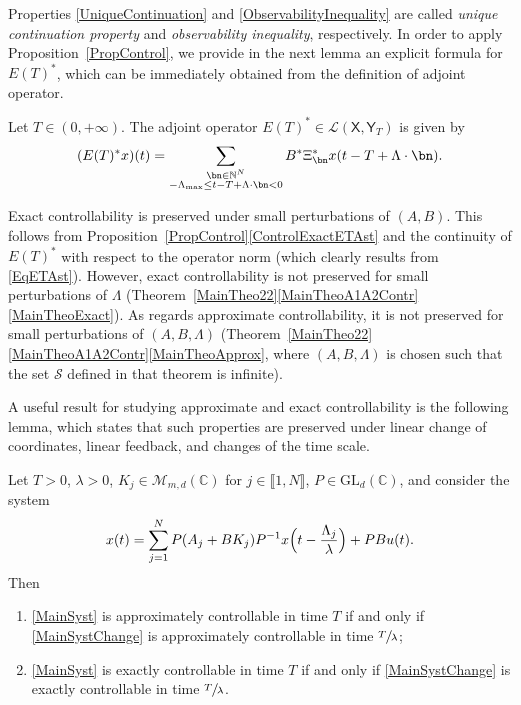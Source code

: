 Properties \eqref{UniqueContinuation} and \eqref{ObservabilityInequality} are called \emph{unique continuation property} and \emph{observability inequality}, respectively. In order to apply Proposition~\ref{PropControl}, we provide in the next lemma an explicit formula for $E(T)^\ast$, which can be immediately obtained from the definition of adjoint operator.

\begin{lemm}
\label{LemmETAdj}
Let $T \in (0, +\infty)$. The adjoint operator $E(T)^\ast \in \mathcal L(\mathsf X, \mathsf Y_T)$ is given by
\begin{equation}
\label{EqETAst}
(E(T)^\ast x)(t) = \sum_{\substack{\bn \in \mathbb N^N \\ -\Lambda_{\max} \leq t - T + \Lambda \cdot \bn < 0}} B^\ast \Xi_{\bn}^\ast x(t - T + \Lambda \cdot \bn).
\end{equation}
\end{lemm}

\begin{remk}
Exact controllability is preserved under small perturbations of $(A, B)$. This follows from Proposition~\ref{PropControl}\eqref{ControlExactETAst} and the continuity of $E(T)^\ast$ with respect to the operator norm (which clearly results from \eqref{EqETAst}). However, exact controllability is not preserved for small perturbations of $\Lambda$ (\cf Theorem~\ref{MainTheo22}\eqref{MainTheoA1A2Contr}\eqref{MainTheoExact}). As regards approximate controllability, it is not preserved for small perturbations of $(A, B, \Lambda)$ (\cf Theorem~\ref{MainTheo22}\eqref{MainTheoA1A2Contr}\eqref{MainTheoApprox}, where $(A, B, \Lambda)$ is chosen such that the set $\mathcal S$ defined in that theorem is infinite).
\end{remk}

A useful result for studying approximate and exact controllability is the following lem\-ma, which states that such properties are preserved under linear change of coordinates, linear feedback, and changes of the time scale.

\begin{lemm}
\label{LemmControlDelayInvariant}
Let $T > 0$, $\lambda > 0$, $K_j \in \mathcal M_{m, d}(\mathbb C)$ for $j \in \llbracket 1, N\rrbracket$, $P \in \mathrm{GL}_d(\mathbb C)$, and consider the system
\begin{equation}
\label{MainSystChange}
x(t) = \sum_{j=1}^N P(A_j + B K_j) P^{-1} x\Bigl(t - \frac{\Lambda_j}{\lambda}\Bigr) + P B u(t).
\end{equation}
Then
\begin{enumerate}
\item\label{ApproxContrlIff} \eqref{MainSyst} is approximately controllable in time $T$ if and only if \eqref{MainSystChange} is approximately controllable in time $\sfrac{T}{\lambda}$;

\item\label{ExactContrlIff} \eqref{MainSyst} is exactly controllable in time $T$ if and only if \eqref{MainSystChange} is exactly controllable in time $\sfrac{T}{\lambda}$.
\end{enumerate}
\end{lemm}

